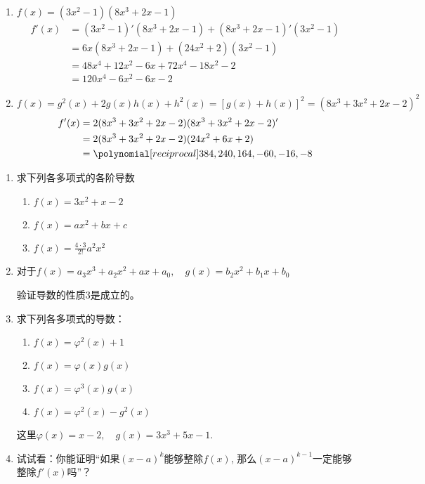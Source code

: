     \begin{solution}
\begin{enumerate}
    \item $f(x)=(3x^2-1)(8x^3+2x-1)$
\[\begin{split}
    f' (x) &= (3x^2-1)' (8x^3+2x-1)+(8x^3+2x-1)' (3x^2-1) \\
    &=6x (8x^3+2x-1) + (24x^2+2) (3x^2-1)\\
    &=48x^4+12x^2-6x+72x^4-18x^2-2\\
    &=120x^4-6x^2-6x-2
\end{split}\]
    \item $f(x)=g^2 (x) +2g (x) h (x) +h^2 (x) =[g(x)+h(x)]^2=(8x^3+3x^2+2x-2)^2$
\[\begin{split}
    f'(x)&=2(8x^3+3x^2+2x-2)(8x^3+3x^2+2x-2)'\\
    &=2(8x^3+3x^2+2x-2)(24x^2+6x+2)\\
    &=\poly{384,240,164,-60,-16,-8}
\end{split}\]
\end{enumerate}
 \end{solution}
           
\begin{ex}
\begin{enumerate}
    \item 求下列各多项式的各阶导数
\begin{multicols}{2}
\begin{enumerate}
    \item $f (x) =3x^2+x-2$
    \item $f(x) =ax^2+bx+c$
    \item $f(x)=\frac{4\cdot 3}{2!}a^2x^2$
\end{enumerate}
\end{multicols}

    \item 对于$f(x)=a_3x^3+a_2x^2+ax+a_0,\quad g(x)=b_2x^2+b_1x+b_0$
    
    验证导数的性质3是成立的。

    \item 求下列各多项式的导数：
\begin{multicols}{2}
\begin{enumerate}
    \item $f (x) =\varphi^2 (x) +1$
    \item $f(x)=\varphi(x)g(x)$
    \item $f (x) =\varphi^3 (x) g (x)$
    \item $f(x)=\varphi^2(x)-g^2(x)$
\end{enumerate}
\end{multicols}
这里$\varphi(x)=x-2,\quad g(x)=3x^3+5x-1$.
    \item 试试看：你能证明“如果$(x-a)^k$能够整除$f(x)$, 那么$(x-a)^{k-1}$一定能够整除$f'(x)$吗”？
\end{enumerate}
\end{ex}
 
